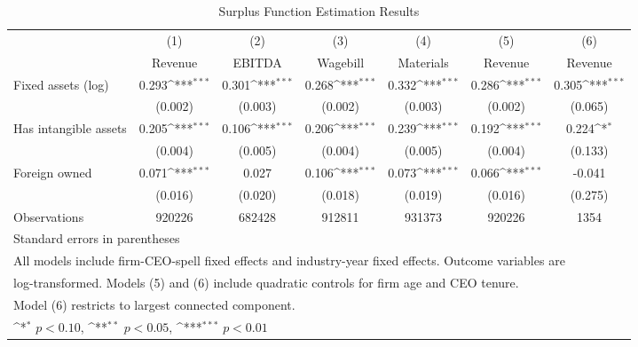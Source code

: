 \begin{table}[htbp]\centering
\def\sym#1{\ifmmode^{#1}\else\(^{#1}\)\fi}
\caption{Surplus Function Estimation Results}
\begin{tabular}{l*{6}{c}}
\toprule
                    &\multicolumn{1}{c}{(1)}&\multicolumn{1}{c}{(2)}&\multicolumn{1}{c}{(3)}&\multicolumn{1}{c}{(4)}&\multicolumn{1}{c}{(5)}&\multicolumn{1}{c}{(6)}\\
                    &\multicolumn{1}{c}{Revenue}&\multicolumn{1}{c}{EBITDA}&\multicolumn{1}{c}{Wagebill}&\multicolumn{1}{c}{Materials}&\multicolumn{1}{c}{Revenue}&\multicolumn{1}{c}{Revenue}\\
\midrule
Fixed assets (log)  &       0.293\sym{***}&       0.301\sym{***}&       0.268\sym{***}&       0.332\sym{***}&       0.286\sym{***}&       0.305\sym{***}\\
                    &     (0.002)         &     (0.003)         &     (0.002)         &     (0.003)         &     (0.002)         &     (0.065)         \\
\addlinespace
Has intangible assets&       0.205\sym{***}&       0.106\sym{***}&       0.206\sym{***}&       0.239\sym{***}&       0.192\sym{***}&       0.224\sym{*}  \\
                    &     (0.004)         &     (0.005)         &     (0.004)         &     (0.005)         &     (0.004)         &     (0.133)         \\
\addlinespace
Foreign owned       &       0.071\sym{***}&       0.027         &       0.106\sym{***}&       0.073\sym{***}&       0.066\sym{***}&      -0.041         \\
                    &     (0.016)         &     (0.020)         &     (0.018)         &     (0.019)         &     (0.016)         &     (0.275)         \\
\midrule
Observations        &      920226         &      682428         &      912811         &      931373         &      920226         &        1354         \\
\bottomrule
\multicolumn{7}{l}{\footnotesize Standard errors in parentheses}\\
\multicolumn{7}{l}{\footnotesize All models include firm-CEO-spell fixed effects and industry-year fixed effects. Outcome variables are}\\
\multicolumn{7}{l}{\footnotesize log-transformed. Models (5) and (6) include quadratic controls for firm age and CEO tenure.}\\
\multicolumn{7}{l}{\footnotesize Model (6) restricts to largest connected component.}\\
\multicolumn{7}{l}{\footnotesize \sym{*} \(p<0.10\), \sym{**} \(p<0.05\), \sym{***} \(p<0.01\)}\\
\end{tabular}
\end{table}
